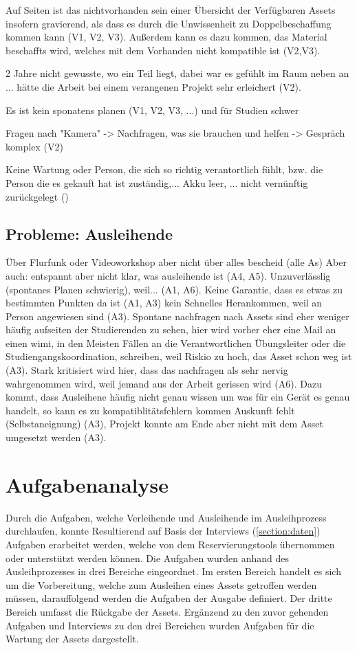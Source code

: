 Auf Seiten ist das nichtvorhanden sein einer Übersicht der Verfügbaren Assets insofern gravierend,
als dass es durch die Unwissenheit zu Doppelbeschaffung kommen kann (V1, V2, V3). Außerdem kann es
dazu kommen, das Material beschaffts wird, welches mit dem Vorhanden nicht kompatible ist (V2,V3).

2 Jahre nicht gewusste, wo ein Teil liegt, dabei war es gefühlt im Raum neben an ... hätte die
Arbeit bei einem verangenen Projekt sehr erleichert (V2).

Es ist kein sponatens planen (V1, V2, V3, ...) und für Studien schwer

Fragen nach "Kamera" -> Nachfragen, was sie brauchen und helfen -> Gespräch komplex (V2) 

Keine Wartung oder Person, die sich so richtig verantortlich fühlt, bzw. die Person die es gekauft
hat ist zuständig,... Akku leer, ... nicht vernünftig zurückgelegt ()

\subsection*{Probleme: Ausleihende}
Über Flurfunk oder Videoworkshop aber nicht über alles bescheid (alle As) Aber auch: entspannt aber
nicht klar, was ausleihende ist (A4, A5). Unzuverlässlig (spontanes Planen schwierig), weil... (A1,
A6). Keine Garantie, dass es etwas zu bestimmten Punkten da ist (A1, A3) kein Schnelles Herankommen,
weil an Person angewiesen sind (A3). Spontane nachfragen nach Assets sind eher weniger häufig
aufseiten der Studierenden zu sehen, hier wird vorher eher eine Mail an einen \ac{wimi}, in den
Meisten Fällen an die Verantwortlichen Übungsleiter oder die Studiengangskoordination, schreiben,
weil Riskio zu hoch, das Asset schon weg ist (A3). Stark kritisiert wird hier, dass das nachfragen
als sehr nervig wahrgenommen wird, weil jemand aus der Arbeit gerissen wird (A6). Dazu kommt, dass
Ausleihene häufig nicht genau wissen um was für ein Gerät es genau handelt, so kann es zu
kompatiblitätsfehlern kommen Auskunft fehlt (Selbstaneignung) (A3), Projekt konnte am Ende aber
nicht mit dem Asset umgesetzt werden (A3). 


\section{Aufgabenanalyse}
\label{section:aufgaben}
Durch die Aufgaben, welche Verleihende und Ausleihende im Ausleihprozess durchlaufen, konnte
Resultierend auf Basis der Interviews (\ref{section:daten}) Aufgaben erarbeitet werden, welche von
dem Reservierungstools übernommen oder unterstützt werden können. Die Aufgaben wurden anhand des
Ausleihprozesses in drei Bereiche eingeordnet. Im ersten Bereich handelt es sich um die
Vorbereitung, welche zum Ausleihen eines Assets getroffen werden müssen, darauffolgend werden die
Aufgaben der Ausgabe definiert. Der dritte Bereich umfasst die Rückgabe der Assets. Ergänzend zu den
zuvor gehenden Aufgaben und Interviews zu den drei Bereichen wurden Aufgaben für die Wartung der
Assets dargestellt.

